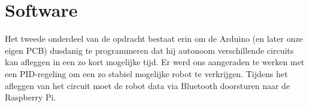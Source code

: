 \section{Software}
Het tweede onderdeel van de opdracht bestaat erin om de Arduino (en later onze eigen PCB) dusdanig te programmeren dat hij autonoom verschillende circuits kan afleggen in een zo kort mogelijke tijd. Er werd ons aangeraden te werken met een PID-regeling om een zo stabiel mogelijke robot te verkrijgen. Tijdens het afleggen van het circuit moet de robot data via Bluetooth doorsturen naar de Raspberry Pi.


 



